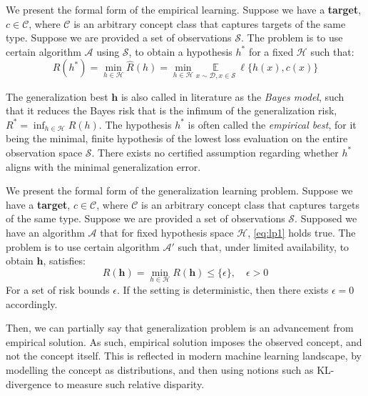 \documentclass[
  journal=largetwo,
  year=2025,
  volume=37,
]{cup-journal}
\begin{document}
\begin{definition}
    We present the formal form of the empirical learning. Suppose we have a \textbf{target}, $c\in\mathcal{C}$, where $\mathcal{C}$ is an arbitrary concept class that captures targets of the same type. Suppose we are provided a set of observations $\mathcal{S}$. The problem is to use certain algorithm $\mathcal{A}$ using $\mathcal{S}$, to obtain a hypothesis $h^{*}$ for a fixed $\mathcal{H}$ such that: 
    \begin{equation}\label{eq:lp1}
        R(h^{*}) = \min_{h\in\mathcal{H}} \hat{R}(h) = \min_{h\in\mathcal{H}} \underset{x\sim\mathcal{D}, x\in \mathcal{S}}{\mathbb{E}}\:\ell\{h(x),c(x)\}
    \end{equation} 
\end{definition}

The generalization best $\bm{h}$ is also called in literature as the \textit{Bayes model}, such that it reduces the Bayes risk that is the infimum of the generalization risk, $R^{*}=\inf_{h\in \mathcal{H}}R(h)$. The hypothesis $h^{*}$ is often called the \textit{empirical best}, for it being the minimal, finite hypothesis of the lowest loss evaluation on the entire observation space $\mathcal{S}$. There exists no certified assumption regarding whether $h^{*}$ aligns with the minimal generalization error.

\begin{definition}
    We present the formal form of the generalization learning problem. Suppose we have a \textbf{target}, $c\in\mathcal{C}$, where $\mathcal{C}$ is an arbitrary concept class that captures targets of the same type. Suppose we are provided a set of observations $\mathcal{S}$. Supposed we have an algorithm $\mathcal{A}$ that for fixed hypothesis space $\mathcal{H}$, \eqref{eq:lp1} holds true. The problem is to use certain algorithm $\mathcal{A}'$ such that, under limited availability, to obtain $\bm{h}$, satisfies: \begin{equation}
        R(\bm{h}) = \min_{h\in \mathcal{H}} R(\bm{h}) \leq \{\epsilon\}, \quad \epsilon > 0 
    \end{equation}
    For a set of risk bounds $\epsilon$. If the setting is deterministic, then there exists $\epsilon=0$ accordingly. 
\end{definition}

Then, we can partially say that generalization problem is an advancement from empirical solution. As such, empirical solution imposes the observed concept, and not the concept itself. This is reflected in modern machine learning landscape, by modelling the concept as distributions, and then using notions such as KL-divergence to measure such relative disparity. 
\end{document}
